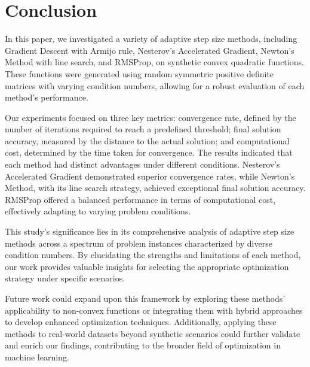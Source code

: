 \documentclass[11pt]{article}
\begin{document}
\section{Conclusion}

In this paper, we investigated a variety of adaptive step size methods, including Gradient Descent with Armijo rule, Nesterov's Accelerated Gradient, Newton's Method with line search, and RMSProp, on synthetic convex quadratic functions. These functions were generated using random symmetric positive definite matrices with varying condition numbers, allowing for a robust evaluation of each method's performance.

Our experiments focused on three key metrics: convergence rate, defined by the number of iterations required to reach a predefined threshold; final solution accuracy, measured by the distance to the actual solution; and computational cost, determined by the time taken for convergence. The results indicated that each method had distinct advantages under different conditions. Nesterov's Accelerated Gradient demonstrated superior convergence rates, while Newton's Method, with its line search strategy, achieved exceptional final solution accuracy. RMSProp offered a balanced performance in terms of computational cost, effectively adapting to varying problem conditions.

This study's significance lies in its comprehensive analysis of adaptive step size methods across a spectrum of problem instances characterized by diverse condition numbers. By elucidating the strengths and limitations of each method, our work provides valuable insights for selecting the appropriate optimization strategy under specific scenarios.

Future work could expand upon this framework by exploring these methods' applicability to non-convex functions or integrating them with hybrid approaches to develop enhanced optimization techniques. Additionally, applying these methods to real-world datasets beyond synthetic scenarios could further validate and enrich our findings, contributing to the broader field of optimization in machine learning.


\end{document}
